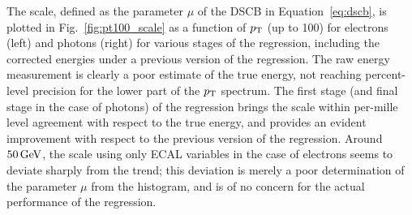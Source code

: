 The scale, defined as the parameter $\mu$ of the DSCB in Equation~\ref{eq:dscb}, is plotted in Fig.~\ref{fig:pt100_scale} as a function of $p_\mathrm{T}$ (up to 100\GeV) for electrons (left) and photons (right) for various stages of the regression, including the corrected energies under a previous version of the regression.
% 
The raw energy measurement is clearly a poor estimate of the true energy, not reaching percent-level precision for the lower part of the $p_\mathrm{T}$ spectrum.
% 
The first stage (and final stage in the case of photons) of the regression brings the scale within per-mille level agreement with respect to the true energy, and provides an evident improvement with respect to the previous version of the regression.
% 
Around $50\,\text{GeV}$, the scale using only ECAL variables in the case of electrons seems to deviate sharply from the trend; this deviation is merely a poor determination of the parameter $\mu$ from the histogram, and is of no concern for the actual performance of the regression.
% 


